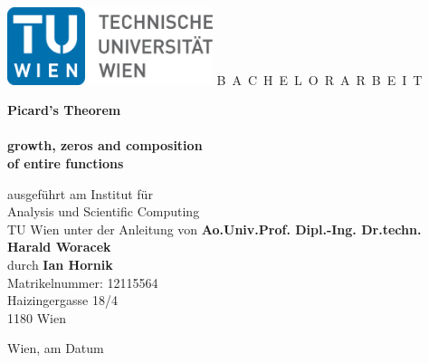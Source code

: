 \documentclass[a4paper,11pt,bibliography=totoc,listof=totoc,headinclude=true,cleardoublepage=empty,oneside]{scrbook}
\newcommand{\1}{\mathbbm{1}}
\theoremstyle{plain}
\theoremstyle{definition}
\begin{document}


\begin{titlepage}
  \begin{center}
    \includegraphics[width=0.45\textwidth]{TULogo.eps}
    \vskip 1cm%
    {\LARGE B~\Large A~C~H~E~L~O~R~A~R~B~E~I~T}
    \vskip 8mm
    {\huge\bfseries{} Picard's Theorem \\  \\ growth, zeros and composition \\ of entire functions \par}
    \vskip 1cm
    \large 
    ausgef\"uhrt am    
    \vskip 0.75cm
    {\Large Institut f\"ur\\[1ex] Analysis und Scientific Computing}\\[1ex]
    {\Large TU Wien}
    \vskip0.75cm
    unter der Anleitung von
    \vskip0.75cm
    {\Large\bfseries Ao.Univ.Prof. Dipl.-Ing. Dr.techn. Harald Woracek}\\[1ex]
    \vskip 0.5cm
    durch
    \vskip 0.5cm
    {\Large\bfseries Ian Hornik}\\[1ex]
    {Matrikelnummer: 12115564}\\[1ex]
    {Haizingergasse 18/4}\\[1ex]
    {1180 Wien}
  \end{center}
  
  \vfill
  
  \small
  Wien, am {\color{change} Datum} %
  \vspace*{-15mm}
\end{titlepage}

\cleardoublepage


\tableofcontents

\cleardoublepage
{}





\end{document}
